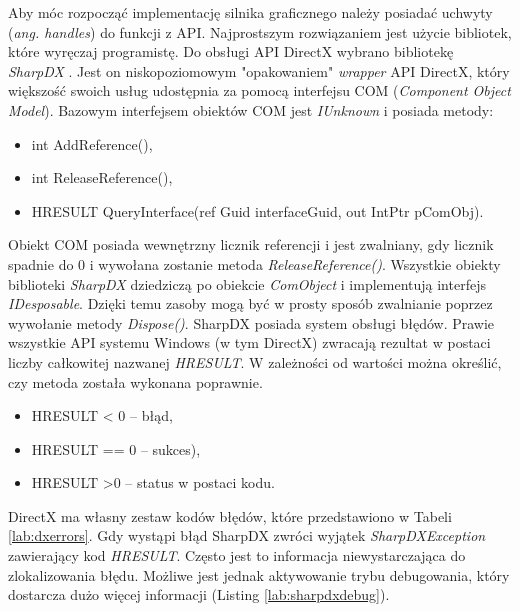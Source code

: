 \documentclass[archive]{mgr}
\begin{document}
Aby móc rozpocząć implementację silnika graficznego należy posiadać uchwyty (\emph{ang. handles}) do funkcji z API. Najprostszym rozwiązaniem jest użycie bibliotek, które wyręczaj programistę. Do obsługi API DirectX wybrano bibliotekę \emph{SharpDX} \cite{sharpdx}. Jest on niskopoziomowym "opakowaniem" \emph{wrapper} API DirectX, który większość swoich usług udostępnia za pomocą interfejsu COM (\emph{Component Object Model}). Bazowym interfejsem obiektów COM jest \emph{IUnknown} i posiada metody:

\begin{itemize}
  \item int AddReference(),
  \item int ReleaseReference(),
  \item HRESULT QueryInterface(ref Guid interfaceGuid, out IntPtr pComObj).

\end{itemize}

Obiekt COM posiada wewnętrzny licznik referencji i jest zwalniany, gdy licznik spadnie do 0 i wywołana zostanie metoda \emph{ReleaseReference()}. Wszystkie obiekty biblioteki \emph{SharpDX} dziedziczą po obiekcie \emph{ComObject} i implementują interfejs \emph{IDesposable}. Dzięki temu zasoby mogą być w prosty sposób zwalnianie poprzez wywołanie metody \emph{Dispose()}.
\newpage
SharpDX posiada system obsługi błędów. Prawie wszystkie API systemu Windows (w tym DirectX) zwracają rezultat w postaci liczby całkowitej nazwanej \emph{HRESULT}. W zależności od wartości można określić, czy metoda została wykonana poprawnie.

\begin{itemize}
  \item HRESULT < 0 – błąd,
  \item HRESULT == 0 – sukces),
  \item HRESULT >0 – status w postaci kodu.

\end{itemize}

DirectX ma własny zestaw kodów błędów, które przedstawiono w Tabeli \ref{lab:dxerrors}. Gdy wystąpi błąd SharpDX zwróci wyjątek \emph{SharpDXException} zawierający kod \emph{HRESULT}. Często jest to informacja niewystarczająca do zlokalizowania błędu. Możliwe jest jednak aktywowanie trybu debugowania, który dostarcza dużo więcej informacji (Listing \ref{lab:sharpdxdebug}).
\end{document}
